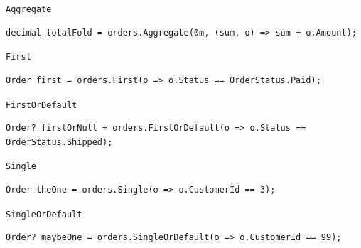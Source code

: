 \documentclass[aspectratio=169,10pt,t]{beamer}
\begin{document}
\begin{frame}[fragile]{\texttt{Aggregate}}
  \slidetop
\begin{lstlisting}[style=csharp,basicstyle=\ttfamily\small]
decimal totalFold = orders.Aggregate(0m, (sum, o) => sum + o.Amount);
\end{lstlisting}
  \slidegap
\end{frame}

\begin{frame}[fragile]{\texttt{First}}
  \slidetop
\begin{lstlisting}[style=csharp,basicstyle=\ttfamily\small]
Order first = orders.First(o => o.Status == OrderStatus.Paid);
\end{lstlisting}
\end{frame}

\begin{frame}[fragile]{\texttt{FirstOrDefault}}
  \slidetop
\begin{lstlisting}[style=csharp,basicstyle=\ttfamily\fontsize{8.2}{9.6}\selectfont]
Order? firstOrNull = orders.FirstOrDefault(o => o.Status == OrderStatus.Shipped);
\end{lstlisting}
  \slidegap
\end{frame}

\begin{frame}[fragile]{\texttt{Single}}
  \slidetop
\begin{lstlisting}[style=csharp,basicstyle=\ttfamily\small]
Order theOne = orders.Single(o => o.CustomerId == 3);
\end{lstlisting}
  \slidegap
\end{frame}

\begin{frame}[fragile]{\texttt{SingleOrDefault}}
  \slidetop
\begin{lstlisting}[style=csharp,basicstyle=\ttfamily\small]
Order? maybeOne = orders.SingleOrDefault(o => o.CustomerId == 99);
\end{lstlisting}
\end{frame}
\end{document}
